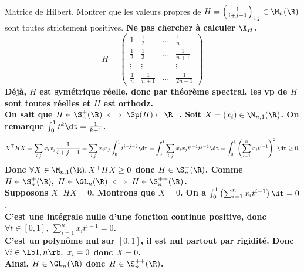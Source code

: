 \documentclass[11pt]{article}
\begin{document}
\begin{exercice}{Matrice de Hilbert.}{}
    Montrer que les valeurs propres de $H=\left( \frac{1}{i+j-1} \right)_{i,j}\in\M_n(\R)$ sont toutes strictement positives.
    \tcblower
    \bf{Ne pas chercher à calculer $\X_H$.}
    \begin{equation*}
        H = \begin{pmatrix} 1 & \frac{1}{2} & ... & \frac{1}{n} \\ \frac{1}{2} & \frac{1}{3} & ... & \frac{1}{n+1} \\ \vdots & \vdots & & \vdots \\ \frac{1}{n} & \frac{1}{n+1} & ... & \frac{1}{2n-1}\end{pmatrix}
    \end{equation*}
    Déjà, $H$ est symétrique réelle, donc par théorème spectral, les vp de $H$ sont toutes réelles et $H$ est orthodz.\\
    On sait que $H\in\S_n^+(\R) \iff \Sp(H)\subset\R_+$. Soit $X=(x_i)\in\M_{n,1}(\R)$. On remarque $\int_0^1 t^k\dt = \frac{1}{k+1}$.
    \begin{align*}
        X^\top HX = \sum_{i,j} x_ix_j\frac{1}{i+j-1} = \sum_{i,j}x_ix_j \int_0^1t^{i+j-2}\dt = \int_0^1 \sum_{i,j} x_i x_j t^{i-1}t^{j-1}\dt = \int_0^1 \left( \sum_{i=1}^n x_i t^{i-1} \right)^2\dt \geq 0.
    \end{align*}
    Donc $\forall X \in \M_{n,1}(\R), X^\top H X \geq 0$ donc $H \in \S_n^+(\R)$. Comme $H\in\S_n^+(\R), ~ H \in \GL_n(\R) \iff H\in\S_n^{++}(\R)$.\\
    Supposons $X^\top H X = 0$. Montrons que $X=0$. On a $\int_0^1\left( \sum_{i=1}^n x_it^{i-1} \right)\dt=0$.\\
    C'est une intégrale nulle d'une fonction \bf{continue} positive, donc $\forall t \in [0,1], ~ \sum_{i=1}^n x_it^{i-1} = 0$.\\
    C'est un polynôme nul sur $[0,1]$, il est nul partout par rigidité. Donc $\forall i \in \lb1,n\rb, ~ x_i = 0$ donc $X=0$.\\
    Ainsi, $H\in\GL_n(\R)$ donc $H\in\S_n^{++}(\R)$.
\end{exercice}

\newcommand*{\Gram}{\nt{Gram}}
\end{document}
